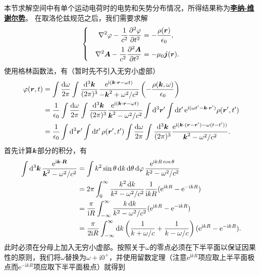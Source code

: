 \documentclass[UTF8, a4paper]{ctexart}
\newcommand*{\ee}{\mathrm{e}}
\newcommand*{\ii}{\mathrm{i}}
\newcommand*{\concept}[1]{\underline{\textbf{#1}}}
\newenvironment{bigcase}{\left\{\quad\begin{aligned}}{\end{aligned}\right.}
\begin{document}
本节求解空间中有单个运动电荷时的电势和矢势分布情况，所得结果称为\concept{李纳-维谢尔势}。
在取洛伦兹规范之后，我们需要求解
\begin{equation}
    \begin{bigcase}
        \laplacian{\varphi} - \frac{1}{c^2} \pdv[2]{\varphi}{t} &= - \frac{\rho(\vb*{r})}{\epsilon_0}, \\
        \laplacian{\vb*{A}} - \frac{1}{c^2} \pdv[2]{\vb*{A}}{t} &= - \mu_0 \vb*{j}(\vb*{r}).
    \end{bigcase}
\end{equation}
使用格林函数法，有（暂时先不引入无穷小虚部）
\[
    \begin{aligned}
        \varphi(\vb*{r}, t) &= \int \frac{\dd{\omega}}{2\pi} \int \frac{\dd[3]{\vb*{k}}}{(2\pi)^3} \frac{\ee^{\ii (\vb*{k} \cdot \vb*{r} - \omega t)}}{- \vb*{k}^2 + \omega^2/c^2} \left( - \frac{\rho(\vb*{k}, \omega)}{\epsilon_0} \right) \\
        &= \frac{1}{\epsilon_0} \int \frac{\dd{\omega}}{2\pi} \int \frac{\dd[3]{\vb*{k}}}{(2\pi)^3} \frac{\ee^{\ii (\vb*{k} \cdot \vb*{r} - \omega t)}}{\vb*{k}^2 - \omega^2/c^2} \int \dd[3]{\vb*{r}'} \int \dd{t'} \ee^{\ii (\omega t' - \vb*{k} \cdot \vb*{r}')} \rho(\vb*{r}', t') \\
        &= \frac{1}{\epsilon_0} \int \dd[3]{\vb*{r}'} \int \dd{t'} \rho(\vb*{r}', t') \int \frac{\dd{\omega}}{2\pi} \int \frac{\dd[3]{\vb*{k}}}{(2\pi)^3} \frac{\ee^{\ii (\vb*{k} \cdot (\vb*{r} - \vb*{r}') - \omega (t - t'))}}{\vb*{k}^2 - \omega^2/c^2}.
    \end{aligned}
\]
首先计算$\vb*{k}$部分的积分，有
\[
    \begin{aligned}
        \int \dd[3]{\vb*{k}} \frac{\ee^{\ii \vb*{k} \cdot \vb*{R}}}{\vb*{k}^2 - \omega^2/c^2} &= \int k^2 \sin \theta \dd{k} \dd{\theta} \dd{\varphi} \frac{\ee^{\ii k R \cos \theta}}{k^2 - \omega^2 / c^2} \\
        &= 2\pi \int_0^\infty \frac{k^2 \dd{k}}{k^2 - \omega^2 / c^2} \frac{1}{\ii k R} (\ee^{\ii k R} - \ee^{-\ii k R}) \\
        &= \frac{\pi}{\ii R} \int_{-\infty}^\infty \frac{k \dd{k}}{k^2 - \omega^2 / c^2} (\ee^{\ii k R} - \ee^{-\ii k R}) \\
        &= \frac{\pi}{2 \ii R} \int_{-\infty}^\infty \dd{k} \left( \frac{1}{k + \omega / c} + \frac{1}{k - \omega / c} \right) (\ee^{\ii k R} - \ee^{-\ii k R}).
    \end{aligned}
\]
此时必须在分母上加入无穷小虚部。按照关于$\omega$的零点必须在下半平面以保证因果性的原则，我们将$\omega$替换为$\omega + \ii 0^+$，并使用留数定理（注意$\ee^{\ii k R}$项应取上半平面极点而$\ee^{- \ii k R}$项应取下半平面极点）就得到
\end{document}
